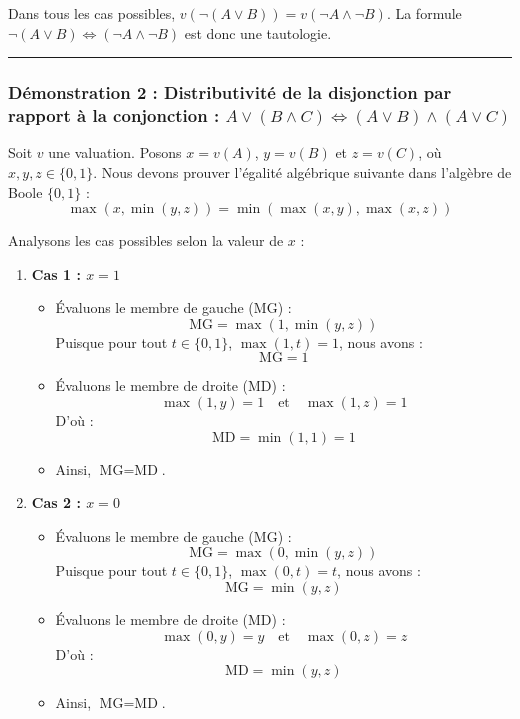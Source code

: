 \documentclass[11pt,a4paper]{article}
\begin{document}
Dans tous les cas possibles,
\(v(\neg(A \lor B)) = v(\neg A \land \neg B)\). La formule
\(\neg(A \lor B) \Leftrightarrow (\neg A \land \neg B)\) est donc une
tautologie.

\begin{center}\rule{0.5\linewidth}{0.5pt}\end{center}

\hypertarget{duxe9monstration-2-distributivituxe9-de-la-disjonction-par-rapport-uxe0-la-conjonction-a-lor-b-land-c-leftrightarrow-a-lor-b-land-a-lor-c}{%
\subsubsection{\texorpdfstring{Démonstration 2 : Distributivité de la
disjonction par rapport à la conjonction :
\(A \lor (B \land C) \Leftrightarrow (A \lor B) \land (A \lor C)\)}{Démonstration 2 : Distributivité de la disjonction par rapport à la conjonction : A \textbackslash lor (B \textbackslash land C) \textbackslash Leftrightarrow (A \textbackslash lor B) \textbackslash land (A \textbackslash lor C)}}\label{duxe9monstration-2-distributivituxe9-de-la-disjonction-par-rapport-uxe0-la-conjonction-a-lor-b-land-c-leftrightarrow-a-lor-b-land-a-lor-c}}

Soit \(v\) une valuation. Posons \(x = v(A)\), \(y = v(B)\) et
\(z = v(C)\), où \(x, y, z \in \{0, 1\}\). Nous devons prouver l'égalité
algébrique suivante dans l'algèbre de Boole \(\{0, 1\}\) :
\[\max(x, \min(y, z)) = \min(\max(x, y), \max(x, z))\]

Analysons les cas possibles selon la valeur de \(x\) :

\begin{enumerate}
\def\labelenumi{\arabic{enumi}.}
\tightlist
\item
  \textbf{Cas 1 : \(x = 1\)}

  \begin{itemize}
  \tightlist
  \item
    Évaluons le membre de gauche (MG) :
    \[\text{MG} = \max(1, \min(y, z))\] Puisque pour tout
    \(t \in \{0, 1\}\), \(\max(1, t) = 1\), nous avons :
    \[\text{MG} = 1\]
  \item
    Évaluons le membre de droite (MD) :
    \[\max(1, y) = 1 \quad \text{et} \quad \max(1, z) = 1\] D'où :
    \[\text{MD} = \min(1, 1) = 1\]
  \item
    Ainsi, \(\text{MG} = \text{MD}\).
  \end{itemize}
\item
  \textbf{Cas 2 : \(x = 0\)}

  \begin{itemize}
  \tightlist
  \item
    Évaluons le membre de gauche (MG) :
    \[\text{MG} = \max(0, \min(y, z))\] Puisque pour tout
    \(t \in \{0, 1\}\), \(\max(0, t) = t\), nous avons :
    \[\text{MG} = \min(y, z)\]
  \item
    Évaluons le membre de droite (MD) :
    \[\max(0, y) = y \quad \text{et} \quad \max(0, z) = z\] D'où :
    \[\text{MD} = \min(y, z)\]
  \item
    Ainsi, \(\text{MG} = \text{MD}\).
  \end{itemize}
\end{enumerate}
\end{document}
